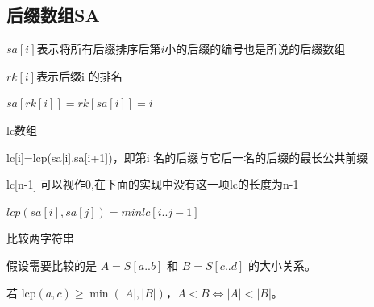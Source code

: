 \documentclass[UTF8,twoside]{ctexart}
\begin{document}
\subsection{后缀数组SA}
$sa[i]$表示将所有后缀排序后第$𝑖$小的后缀的编号也是所说的后缀数组

$rk[i]$表示后缀i 的排名

$sa[rk[i]]=rk[sa[i]]=i$

lc数组

lc[i]=lcp(sa[i],sa[i+1])，即第i 名的后缀与它后一名的后缀的最长公共前缀

lc[n-1] 可以视作0,在下面的实现中没有这一项lc的长度为n-1

$lcp(sa[i],sa[j]) =min{lc[i..j-1]}$

比较两字符串

假设需要比较的是 $A = S[a..b]$ 和 $B = S[c..d]$ 的大小关系。

若 $\mathrm{lcp}(a, c) \ge \min(|A|, |B|)$，$A < B \iff |A| < |B|$。
\end{document}
